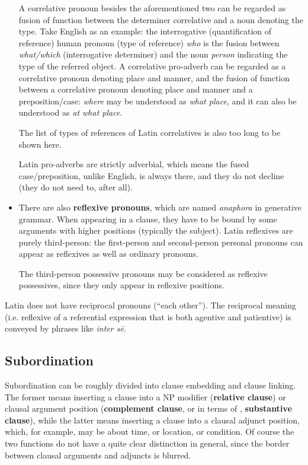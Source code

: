 \documentclass{article}
\newcommand*{\concept}[1]{\textbf{#1}}
\newcommand*{\term}[1]{\emph{#1}}
\newcommand*{\corpus}[1]{\emph{#1}}
\begin{document}
\begin{itemize}
    A correlative pronoun besides the aforementioned two 
    can be regarded as fusion of function between the determiner correlative 
    and a noun denoting the type.
    Take English as an example:
    the interrogative (quantification of reference) human pronoun (type of reference) \corpus{who}
    is the fusion between \corpus{what/which} (interrogative determiner) 
    and the noun \corpus{person} indicating the type of the referred object.
    A correlative pro-adverb can be regarded as a correlative pronoun denoting place and manner,
    and the fusion of function between a correlative pronoun denoting place and manner and a preposition/case:
    \corpus{where} may be understood as \corpus{what place}, and it can also be understood as \corpus{at what place}.
    
    The list of types of references of Latin correlatives is also too long to be shown here.
    
    Latin pro-adverbs are strictly adverbial, 
    which means the fused case/preposition, unlike English, is always there,
    and they do not decline (they do not need to, after all).
    \item There are also \concept{reflexive pronouns},
    which are named \term{anaphora} in generative grammar. 
    When appearing in a clause, they have to be bound by some arguments with higher positions 
    (typically the subject).
    Latin reflexives are purely third-person: 
    the first-person and second-person personal pronouns can appear as reflexives as well as ordinary pronouns.

    The third-person possessive pronouns may be considered as reflexive possessives,
    since they only appear in reflexive positions.
\end{itemize}

Latin does not have reciprocal pronouns (``each other'').
The reciprocal meaning (i.e. reflexive of a referential expression that is both agentive and patientive)
is conveyed by phrases like \corpus{inter s\={e}}. 

\subsection{Subordination}\label{sec:subordination-abs}

Subordination can be roughly divided into clause embedding and clause linking.
The former means inserting a clause into a NP modifier (\concept{relative clause})
or clausal argument position 
(\concept{complement clause}, or in terms of \citep{allen1903allen}, \concept{substantive clause}),
while the latter means inserting a clause into a clausal adjunct position,
which, for example, may be about time, or location, or condition.
Of course the two functions do not have a quite clear distinction in general,
since the border between clausal arguments and adjuncts is blurred.
\end{document}

